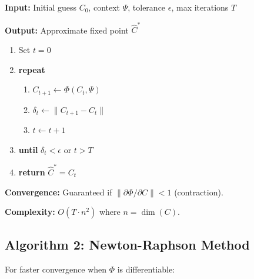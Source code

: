\begin{tcolorbox}[colback=gray!5!white, colframe=gray!75!black,
    title=Algorithm AZ-C1: Fixed-Point Iteration]
\textbf{Input:} Initial guess $C_0$, context $\Psi$, tolerance $\epsilon$, max iterations $T$

\textbf{Output:} Approximate fixed point $\hat{C}^*$

\begin{enumerate}[nosep]
\item Set $t = 0$
\item \textbf{repeat}
    \begin{enumerate}[nosep]
    \item $C_{t+1} \leftarrow \Phi(C_t, \Psi)$
    \item $\delta_t \leftarrow \|C_{t+1} - C_t\|$
    \item $t \leftarrow t + 1$
    \end{enumerate}
\item \textbf{until} $\delta_t < \epsilon$ or $t > T$
\item \textbf{return} $\hat{C}^* = C_t$
\end{enumerate}

\textbf{Convergence:} Guaranteed if $\|\partial \Phi / \partial C\| < 1$ (contraction).

\textbf{Complexity:} $O(T \cdot n^2)$ where $n = \dim(C)$.
\end{tcolorbox}

\subsection{Algorithm 2: Newton-Raphson Method}

For faster convergence when $\Phi$ is differentiable:


